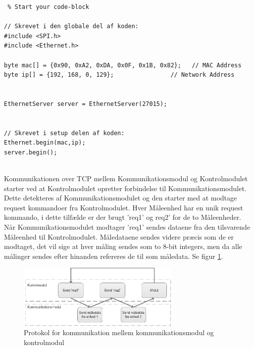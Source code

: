 \begin{lstlisting} % Start your code-block

// Skrevet i den globale del af koden:
#include <SPI.h>
#include <Ethernet.h>

byte mac[] = {0x90, 0xA2, 0xDA, 0x0F, 0x1B, 0x82};   // MAC Address
byte ip[] = {192, 168, 0, 129};                // Network Address


EthernetServer server = EthernetServer(27015);


// Skrevet i setup delen af koden:
Ethernet.begin(mac,ip);
server.begin();


\end{lstlisting}


Kommunikationen over TCP mellem Kommunikationsmodul og Kontrolmodulet starter ved at Kontrolmodulet opretter forbindelse til Kommunikationsmodulet. Dette detekteres af Kommunikationsmodulet og den starter med at modtage request kommandoer fra Kontrolmodulet. Hver Måleenhed har en unik request kommando, i dette tilfælde er der brugt 'req1' og req2' for de to Måleenheder. Når Kommunikationsmodulet modtager 'req1' sendes dataene fra den tilsvarende Måleenhed til Kontrolmodulet. Måledataene sendes videre præcis som de er modtaget, det vil sige at hver måling sendes som to 8-bit integers, men da alle målinger sendes efter hinanden refereres de til som måledata. Se figur \ref{fig:TCPProtokol}.

\begin{figure}[H] %
	\centering
	\includegraphics[width=0.7\textwidth]{Figure/TCPProtokol}
	\caption{Protokol for kommunikation mellem kommunikationsmodul og kontrolmodul}
	\label{fig:TCPProtokol}
\end{figure}



